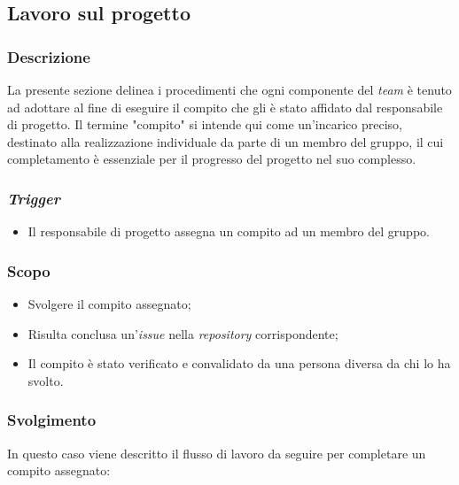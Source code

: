 \subsection{Lavoro sul progetto}
\label{lavoro-sul-progetto}

\subsubsection{Descrizione}
La presente sezione delinea i procedimenti che ogni componente del \textit{team} è tenuto ad adottare al fine di eseguire il compito che gli è stato affidato dal responsabile di progetto. 
Il termine "compito" si intende qui come un'incarico preciso, destinato alla realizzazione individuale da parte di un membro del gruppo, il cui completamento è essenziale per il progresso del progetto nel suo complesso.


\subsubsection{\textit{Trigger}}
\begin{itemize}
	\item Il responsabile di progetto assegna un compito ad un membro del
	      gruppo.
\end{itemize}

\subsubsection{Scopo}
\begin{itemize}
	\item Svolgere il compito assegnato;
	\item Risulta conclusa un'\textit{issue\g} nella \textit{repository\g}
	      corrispondente;
	\item Il compito è stato verificato e convalidato da una persona diversa
	      da chi lo ha svolto.
\end{itemize}

\subsubsection{Svolgimento}
In questo caso viene descritto il flusso di lavoro da seguire per completare
un compito assegnato:

